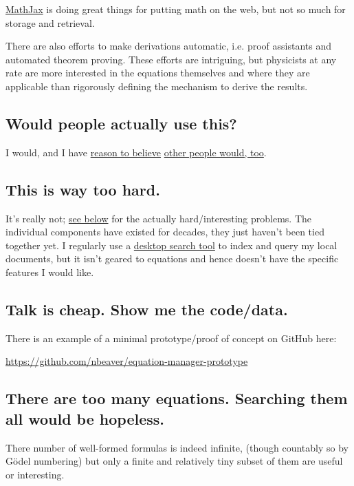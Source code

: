 \documentclass[12pt,letterpaper]{article}
\begin{document}
\href{http://www.mathjax.org/}
{MathJax} is doing great things for putting math on the web,
but not so much for storage and retrieval.

There are also efforts to make derivations automatic,
i.e. proof assistants and automated theorem proving.
These efforts are intriguing,
but physicists at any rate are more interested in the equations themselves and where they are applicable
than rigorously defining the mechanism to derive the results.

\subsection{Would people actually use this?}

I would, and I have
\href{http://www.researchgate.net/post/I_am_looking_for_an_equation_database_or_digital_list_of_equations}
{reason to believe}
\href{http://productforums.google.com/forum/#!topic/websearch/lVJiyCSl-xk}
{other people would, too}.

\subsection{This is way too hard.}

It's really not;
\hyperref[sec:ambitious]
{see below} for the actually hard/interesting problems.
The individual components have existed for decades,
they just haven't been tied together yet.
I regularly use a
\href{https://en.wikipedia.org/wiki/Recoll}
{desktop search tool} to index and query my local documents,
but it isn't geared to equations and hence doesn't have the specific features I would like.

\subsection{Talk is cheap. Show me the code/data.}

There is an example of a minimal prototype/proof of concept on GitHub here:

\url{https://github.com/nbeaver/equation-manager-prototype}

\subsection{There are too many equations. Searching them all would be hopeless.}

There number of well-formed formulas is indeed infinite,
(though countably so by Gödel numbering)
but only a finite and relatively tiny subset of them are useful or interesting.
\end{document}
